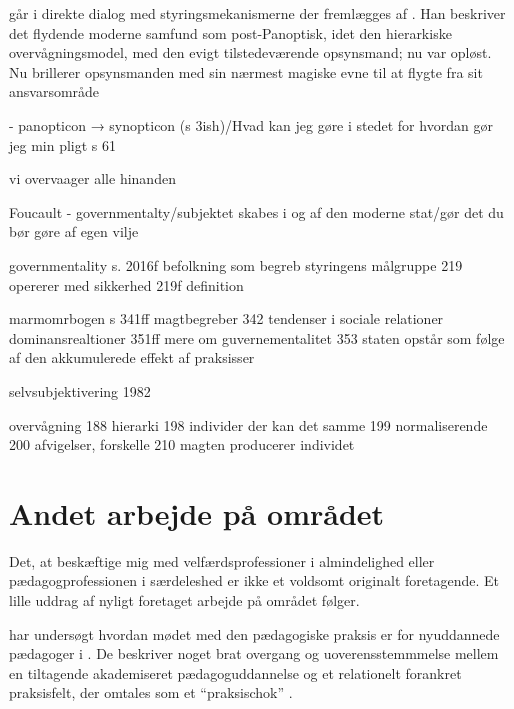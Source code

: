 \citeauthor{baumanLiquidModernity2000} går i direkte dialog med styringsmekanismerne der fremlægges af \citeauthor{foucaultOvervagningOgStraf2005}.
Han beskriver det flydende moderne samfund som post-Panoptisk, idet den hierarkiske overvågningsmodel, med den evigt tilstedeværende opsynsmand; nu var opløst.
Nu brillerer opsynsmanden med sin nærmest magiske evne til at flygte fra sit ansvarsområde \autocite[s. 11]{baumanLiquidModernity2000}

- panopticon → synopticon (s 3ish)/Hvad kan jeg gøre i stedet for hvordan gør jeg min pligt s 61

vi overvaager alle hinanden

Foucault - governmentalty/subjektet skabes i og af den moderne stat/gør det du bør gøre af egen vilje

governmentality s. 2016f befolkning som begreb
                         styringens målgruppe
                  219 opererer med sikkerhed
                  219f definition


marmomrbogen \autocite{villadsenMichelFoucault2013}
            s 341ff magtbegreber
              342 tendenser i sociale relationer
                   dominansrealtioner
              351ff mere om guvernementalitet
              353 staten opstår som følge af den akkumulerede effekt af praksisser

selvsubjektivering 1982 \autocite{foucaultSubjectPower1982}

overvågning \autocite{foucaultOvervagningOgStraf2005} 
       188 hierarki
       198 individer der kan det samme
       199 normaliserende
       200 afvigelser, forskelle 
       210 magten producerer individet

\section{Andet arbejde på området}
Det, at beskæftige mig med velfærdsprofessioner i almindelighed eller pædagogprofessionen i særdeleshed er ikke et voldsomt originalt foretagende.
Et lille uddrag af nyligt foretaget arbejde på området følger.

\citeauthor{nielsenAttraktivPaPapiret2017} har undersøgt hvordan mødet med den pædagogiske praksis er for nyuddannede pædagoger i .
De beskriver noget brat overgang og uoverensstemmmelse mellem en tiltagende akademiseret pædagoguddannelse og et relationelt forankret praksisfelt, der omtales som et “praksischok” \autocite{nielsenAttraktivPaPapiret2017}.

